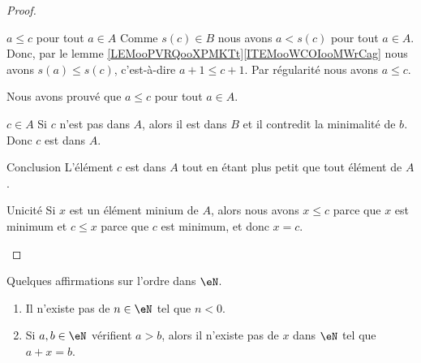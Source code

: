 \begin{proof}
\begin{subproof}
    \item[\( a\leq c\) pour tout \( a\in A\)]
        Comme \( s(c)\in B\) nous avons \( a< s(c)\) pour tout \( a\in A\). Donc, par le lemme \ref{LEMooPVRQooXPMKTt}\ref{ITEMooWCOIooMWrCag} nous avons \( s(a)\leq s(c)\), c'est-à-dire \( a+1\leq c+1\). Par régularité nous avons \( a\leq c\).

        Nous avons prouvé que \( a\leq c\) pour tout \( a\in A\).
    \item[\( c\in A\)]
        Si \( c\) n'est pas dans \( A\), alors il est dans \( B\) et il contredit la minimalité de \( b\). Donc \( c\) est dans \( A\).
    \item[Conclusion]
        L'élément \( c\) est dans \( A\) tout en étant plus petit que tout élément de \( A\).
    \item[Unicité]
        Si \( x\) est un élément minium de \( A\), alors nous avons \( x\leq c\) parce que \( x\) est minimum et \( c\leq x\) parce que \( c\) est minimum, et donc \( x=c\).
    \end{subproof}
\end{proof}

\begin{lemma}       \label{LEMooYMRJooYIAhBb}
    Quelques affirmations sur l'ordre dans \( \eN\).
    \begin{enumerate}
        \item   \label{ITEMooTLOIooTWNtod}
            Il n'existe pas de \( n\in \eN\) tel que \( n<0\).
        \item       \label{ITEMooPJKQooGfLCUM}
            Si \( a,b\in \eN\) vérifient \( a>b\), alors il n'existe pas de \( x\) dans \( \eN\) tel que \( a+x=b\).
    \end{enumerate}
\end{lemma}

